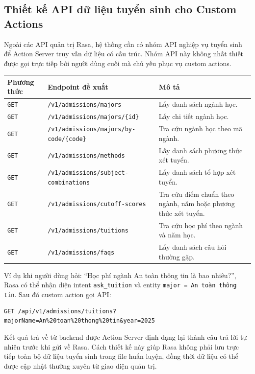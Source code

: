 \subsection{Thiết kế API dữ liệu tuyển sinh cho Custom Actions}

Ngoài các API quản trị Rasa, hệ thống cần có nhóm API nghiệp vụ tuyển sinh để Action Server truy vấn dữ liệu có cấu trúc. Nhóm API này không nhất thiết được gọi trực tiếp bởi người dùng cuối mà chủ yếu phục vụ custom actions.

\begin{longtable}{|p{3cm}|p{5cm}|p{7cm}|}
\hline
\textbf{Phương thức} & \textbf{Endpoint đề xuất} & \textbf{Mô tả} \\
\hline
\texttt{GET} & \texttt{/v1/admissions/majors} & Lấy danh sách ngành học. \\
\hline
\texttt{GET} & \texttt{/v1/admissions/majors/\{id\}} & Lấy chi tiết ngành học. \\
\hline
\texttt{GET} & \texttt{/v1/admissions/majors/by-code/\{code\}} & Tra cứu ngành học theo mã ngành. \\
\hline
\texttt{GET} & \texttt{/v1/admissions/methods} & Lấy danh sách phương thức xét tuyển. \\
\hline
\texttt{GET} & \texttt{/v1/admissions/subject-combinations} & Lấy danh sách tổ hợp xét tuyển. \\
\hline
\texttt{GET} & \texttt{/v1/admissions/cutoff-scores} & Tra cứu điểm chuẩn theo ngành, năm hoặc phương thức xét tuyển. \\
\hline
\texttt{GET} & \texttt{/v1/admissions/tuitions} & Tra cứu học phí theo ngành và năm học. \\
\hline
\texttt{GET} & \texttt{/v1/admissions/faqs} & Lấy danh sách câu hỏi thường gặp. \\
\hline
\end{longtable}

Ví dụ khi người dùng hỏi: ``Học phí ngành An toàn thông tin là bao nhiêu?'', Rasa có thể nhận diện intent \texttt{ask\_tuition} và entity \texttt{major = An toàn thông tin}. Sau đó custom action gọi API:

\begin{verbatim}
GET /api/v1/admissions/tuitions?majorName=An%20toan%20thong%20tin&year=2025
\end{verbatim}

Kết quả trả về từ backend được Action Server định dạng lại thành câu trả lời tự nhiên trước khi gửi về Rasa. Cách thiết kế này giúp Rasa không phải lưu trực tiếp toàn bộ dữ liệu tuyển sinh trong file huấn luyện, đồng thời dữ liệu có thể được cập nhật thường xuyên từ giao diện quản trị.

